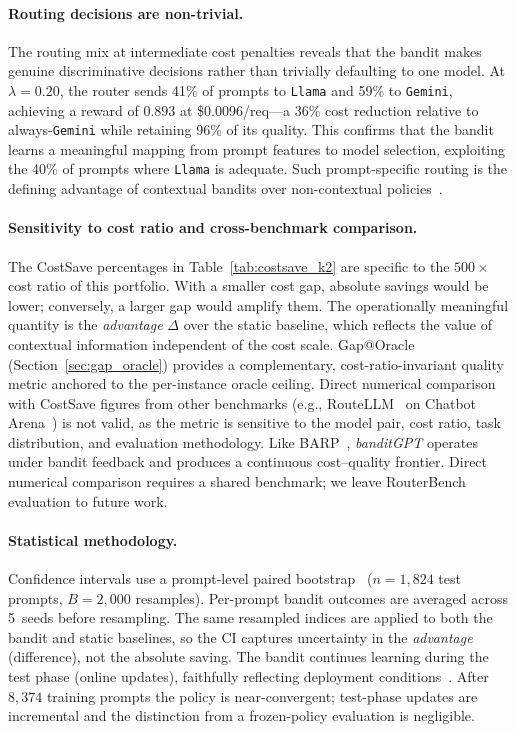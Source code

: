 \paragraph{Routing decisions are non-trivial.}
The routing mix at intermediate cost penalties reveals that the
bandit makes genuine discriminative decisions rather than trivially
defaulting to one model.
At $\lambda{=}0.20$, the router sends 41\% of prompts to
\texttt{Llama} and 59\% to \texttt{Gemini}, achieving a reward of
$0.893$ at \$0.0096/req---a 36\% cost reduction relative to
always-\texttt{Gemini} while retaining 96\% of its quality.
This confirms that the bandit learns a meaningful mapping from
prompt features to model selection, exploiting the 40\% of prompts
where \texttt{Llama} is adequate.
Such prompt-specific routing is the defining advantage of contextual
bandits over non-contextual
policies~\cite{li2010contextual, abbasi2011improved}.

\paragraph{Sensitivity to cost ratio and cross-benchmark comparison.}
The CostSave percentages in Table~\ref{tab:costsave_k2} are
specific to the $500{\times}$ cost ratio of this portfolio.
With a smaller cost gap, absolute savings would be lower;
conversely, a larger gap would amplify them.
The operationally meaningful quantity is the \emph{advantage}
$\Delta$ over the static baseline, which reflects the value of
contextual information independent of the cost scale.
Gap@Oracle (Section~\ref{sec:gap_oracle}) provides a complementary,
cost-ratio-invariant quality metric anchored to the per-instance
oracle ceiling.
Direct numerical comparison with CostSave figures from other
benchmarks (e.g., RouteLLM~\cite{ong2024routellm} on Chatbot
Arena~\cite{zheng2023judging}) is not valid, as the metric is
sensitive to the model pair, cost ratio, task distribution, and
evaluation methodology.
Like BARP~\cite{wang2025barp}, \textit{banditGPT} operates under
bandit feedback and produces a continuous cost--quality frontier.
Direct numerical comparison requires a shared benchmark; we leave
RouterBench~\cite{li2026llmrouterbench} evaluation to future work.

\paragraph{Statistical methodology.}
Confidence intervals use a prompt-level paired
bootstrap~\cite{efron1993bootstrap}
($n{=}1{,}824$ test prompts, $B{=}2{,}000$ resamples).
Per-prompt bandit outcomes are averaged across 5~seeds before
resampling.  The same resampled indices are applied to both the
bandit and static baselines, so the CI captures uncertainty in the
\emph{advantage} (difference), not the absolute saving.
The bandit continues learning during the test phase (online
updates), faithfully reflecting deployment
conditions~\cite{li2010contextual}.  After
$8{,}374$ training prompts the policy is near-convergent; test-phase
updates are incremental and the distinction from a frozen-policy
evaluation is negligible.

